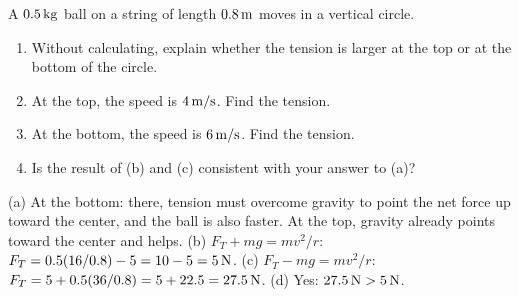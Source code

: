 \begin{exo}{}
A $0.5\,\mathrm{kg}$ ball on a string of length $0.8\,\mathrm{m}$ moves in a vertical circle.
\begin{enumerate}[label=(\alph*)]
\item Without calculating, explain whether the tension is larger at the top or at the bottom of the circle.
\item At the top, the speed is $4\,\mathrm{m/s}$. Find the tension.
\item At the bottom, the speed is $6\,\mathrm{m/s}$. Find the tension.
\item Is the result of (b) and (c) consistent with your answer to (a)?
\end{enumerate}
\work{6cm}
\begin{solution}
(a) At the bottom: there, tension must overcome gravity to point the net force up toward the center, and the ball is also faster. At the top, gravity already points toward the center and helps. \;(b) $F_T+mg=mv^2/r$: $F_T=0.5(16/0.8)-5=10-5=5\,\mathrm{N}$. \;(c) $F_T-mg=mv^2/r$: $F_T=5+0.5(36/0.8)=5+22.5=27.5\,\mathrm{N}$. \;(d) Yes: $27.5\,\mathrm{N}>5\,\mathrm{N}$.
\end{solution}
\end{exo}
